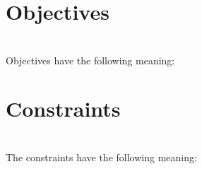 \documentclass{article}
\begin{document}
\printglossary[type=set]
\printglossary[type=param]
\printglossary[type=var]

\section*{Objectives}
\begin{align}

\end{align}

Objectives have the following meaning:
\begin{itemize}

\end{itemize}

\section*{Constraints}
\begin{align}

\end{align}

The constraints have the following meaning:
\begin{itemize}

\end{itemize}
\end{document}
